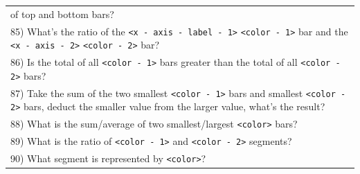 \begin{table}[t]
{\begin{tabular}{|l|}
of top and bottom bars? \\85) What's the ratio of the \texttt{<x - axis - label - 1>} \texttt{<color - 1>} bar and the \texttt{<x - axis - 2>} \texttt{<color - 2>} bar? \\86) Is the total of all \texttt{<color - 1>} bars greater than the total of all \texttt{<color - 2>} bars? \\87) Take the sum of the two smallest \texttt{<color - 1>} bars and smallest \texttt{<color - 2>} bars, deduct the smaller value from the larger value, what's the result? \\88) What is the sum/average of two smallest/largest \texttt{<color>} bars? \\89) What is the ratio of \texttt{<color - 1>} and \texttt{<color - 2>} segments? \\90) What segment is represented by \texttt{<color>}? \\
                                             
 \bottomrule
 
 \end{tabular}}
 \label{tab:templates}
\end{table}